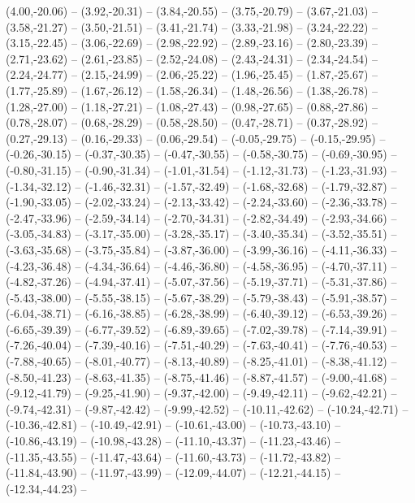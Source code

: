 {  (4.00,-20.06) -- (3.92,-20.31) -- (3.84,-20.55) -- (3.75,-20.79) -- (3.67,-21.03) -- (3.58,-21.27) -- (3.50,-21.51) --
  (3.41,-21.74) -- (3.33,-21.98) -- (3.24,-22.22) -- (3.15,-22.45) -- (3.06,-22.69) -- (2.98,-22.92) -- (2.89,-23.16) --
  (2.80,-23.39) -- (2.71,-23.62) -- (2.61,-23.85) -- (2.52,-24.08) -- (2.43,-24.31) -- (2.34,-24.54) -- (2.24,-24.77) --
  (2.15,-24.99) -- (2.06,-25.22) -- (1.96,-25.45) -- (1.87,-25.67) -- (1.77,-25.89) -- (1.67,-26.12) -- (1.58,-26.34) --
  (1.48,-26.56) -- (1.38,-26.78) -- (1.28,-27.00) -- (1.18,-27.21) -- (1.08,-27.43) -- (0.98,-27.65) -- (0.88,-27.86) --
  (0.78,-28.07) -- (0.68,-28.29) -- (0.58,-28.50) -- (0.47,-28.71) -- (0.37,-28.92) -- (0.27,-29.13) -- (0.16,-29.33) --
  (0.06,-29.54) -- (-0.05,-29.75) -- (-0.15,-29.95) -- (-0.26,-30.15) -- (-0.37,-30.35) -- (-0.47,-30.55) -- (-0.58,-30.75) --
  (-0.69,-30.95) -- (-0.80,-31.15) -- (-0.90,-31.34) -- (-1.01,-31.54) -- (-1.12,-31.73) -- (-1.23,-31.93) -- (-1.34,-32.12) --
  (-1.46,-32.31) -- (-1.57,-32.49) -- (-1.68,-32.68) -- (-1.79,-32.87) -- (-1.90,-33.05) -- (-2.02,-33.24) -- (-2.13,-33.42) --
  (-2.24,-33.60) -- (-2.36,-33.78) -- (-2.47,-33.96) -- (-2.59,-34.14) -- (-2.70,-34.31) -- (-2.82,-34.49) -- (-2.93,-34.66) --
  (-3.05,-34.83) -- (-3.17,-35.00) -- (-3.28,-35.17) -- (-3.40,-35.34) -- (-3.52,-35.51) -- (-3.63,-35.68) -- (-3.75,-35.84) --
  (-3.87,-36.00) -- (-3.99,-36.16) -- (-4.11,-36.33) -- (-4.23,-36.48) -- (-4.34,-36.64) -- (-4.46,-36.80) -- (-4.58,-36.95) --
  (-4.70,-37.11) -- (-4.82,-37.26) -- (-4.94,-37.41) -- (-5.07,-37.56) -- (-5.19,-37.71) -- (-5.31,-37.86) -- (-5.43,-38.00) --
  (-5.55,-38.15) -- (-5.67,-38.29) -- (-5.79,-38.43) -- (-5.91,-38.57) -- (-6.04,-38.71) -- (-6.16,-38.85) -- (-6.28,-38.99) --
  (-6.40,-39.12) -- (-6.53,-39.26) -- (-6.65,-39.39) -- (-6.77,-39.52) -- (-6.89,-39.65) -- (-7.02,-39.78) -- (-7.14,-39.91) --
  (-7.26,-40.04) -- (-7.39,-40.16) -- (-7.51,-40.29) -- (-7.63,-40.41) -- (-7.76,-40.53) -- (-7.88,-40.65) -- (-8.01,-40.77) --
  (-8.13,-40.89) -- (-8.25,-41.01) -- (-8.38,-41.12) -- (-8.50,-41.23) -- (-8.63,-41.35) -- (-8.75,-41.46) -- (-8.87,-41.57) --
  (-9.00,-41.68) -- (-9.12,-41.79) -- (-9.25,-41.90) -- (-9.37,-42.00) -- (-9.49,-42.11) -- (-9.62,-42.21) -- (-9.74,-42.31) --
  (-9.87,-42.42) -- (-9.99,-42.52) -- (-10.11,-42.62) -- (-10.24,-42.71) -- (-10.36,-42.81) -- (-10.49,-42.91) -- (-10.61,-43.00) --
  (-10.73,-43.10) -- (-10.86,-43.19) -- (-10.98,-43.28) -- (-11.10,-43.37) -- (-11.23,-43.46) -- (-11.35,-43.55) -- (-11.47,-43.64) --
  (-11.60,-43.73) -- (-11.72,-43.82) -- (-11.84,-43.90) -- (-11.97,-43.99) -- (-12.09,-44.07) -- (-12.21,-44.15) -- (-12.34,-44.23) --
}
